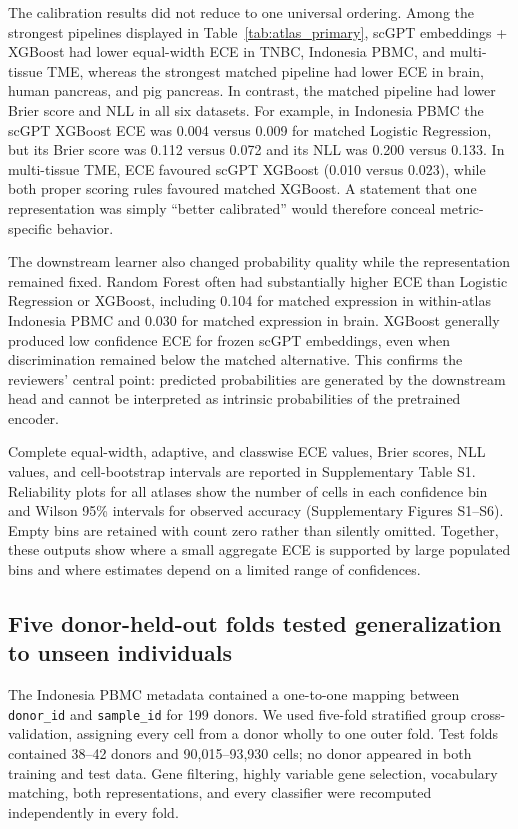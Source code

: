 The calibration results did not reduce to one universal ordering. Among the strongest pipelines displayed in Table~\ref{tab:atlas_primary}, scGPT embeddings + XGBoost had lower equal-width ECE in TNBC, Indonesia PBMC, and multi-tissue TME, whereas the strongest matched pipeline had lower ECE in brain, human pancreas, and pig pancreas. In contrast, the matched pipeline had lower Brier score and NLL in all six datasets. For example, in Indonesia PBMC the scGPT XGBoost ECE was 0.004 versus 0.009 for matched Logistic Regression, but its Brier score was 0.112 versus 0.072 and its NLL was 0.200 versus 0.133. In multi-tissue TME, ECE favoured scGPT XGBoost (0.010 versus 0.023), while both proper scoring rules favoured matched XGBoost. A statement that one representation was simply ``better calibrated'' would therefore conceal metric-specific behavior.

The downstream learner also changed probability quality while the representation remained fixed. Random Forest often had substantially higher ECE than Logistic Regression or XGBoost, including 0.104 for matched expression in within-atlas Indonesia PBMC and 0.030 for matched expression in brain. XGBoost generally produced low confidence ECE for frozen scGPT embeddings, even when discrimination remained below the matched alternative. This confirms the reviewers' central point: predicted probabilities are generated by the downstream head and cannot be interpreted as intrinsic probabilities of the pretrained encoder.

Complete equal-width, adaptive, and classwise ECE values, Brier scores, NLL values, and cell-bootstrap intervals are reported in Supplementary Table S1. Reliability plots for all atlases show the number of cells in each confidence bin and Wilson 95\% intervals for observed accuracy (Supplementary Figures S1--S6). Empty bins are retained with count zero rather than silently omitted. Together, these outputs show where a small aggregate ECE is supported by large populated bins and where estimates depend on a limited range of confidences.

\subsection{Five donor-held-out folds tested generalization to unseen individuals}

The Indonesia PBMC metadata contained a one-to-one mapping between \texttt{donor\_id} and \texttt{sample\_id} for 199 donors. We used five-fold stratified group cross-validation, assigning every cell from a donor wholly to one outer fold. Test folds contained 38--42 donors and 90,015--93,930 cells; no donor appeared in both training and test data. Gene filtering, highly variable gene selection, vocabulary matching, both representations, and every classifier were recomputed independently in every fold.

